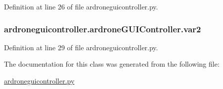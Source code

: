 Definition at line 26 of file ardroneguicontroller.\-py.

\hypertarget{classardroneguicontroller_1_1ardroneGUIController_a49406520dc109e05132990d2f0a5fd10}{
\subsubsection[{var2}]{\setlength{\rightskip}{0pt plus 5cm}ardroneguicontroller.\-ardrone\-G\-U\-I\-Controller.\-var2}}\label{classardroneguicontroller_1_1ardroneGUIController_a49406520dc109e05132990d2f0a5fd10}


Definition at line 29 of file ardroneguicontroller.\-py.



The documentation for this class was generated from the following file\-:\begin{DoxyCompactItemize}
\item 
\hyperlink{ardroneguicontroller_8py}{ardroneguicontroller.\-py}\end{DoxyCompactItemize}
